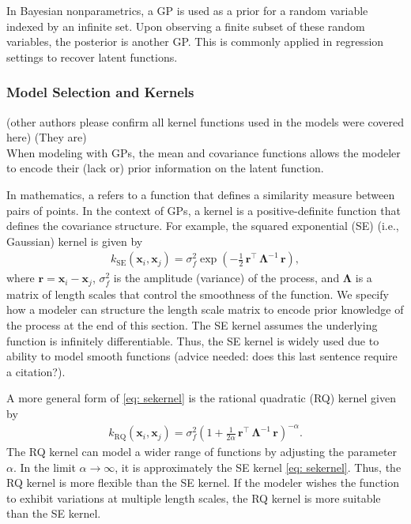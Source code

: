 \documentclass[journal=jacsat,manuscript=article]{achemso}
\newcommand{\mcnote}[1]{{\color{purple} (#1)}}
\newcommand{\alltodo}[1]{{\color{cyan} (#1)}}
\newcommand{\xvec}{\ensuremath{\mathbf{x}}}
\begin{document}
{In Bayesian nonparametrics, a GP is used as a prior for a random variable indexed by an infinite set. Upon observing a finite subset of these random variables, the posterior is another GP. This is commonly applied in regression settings to recover latent functions.

\subsubsection{Model Selection and Kernels}
\alltodo{other authors please confirm all kernel functions used in the models were covered here} 
\mcnote{They are}\\
When modeling with GPs, the mean and covariance functions allows the modeler to encode their (lack or) prior information on the latent function. 

In mathematics, a  refers to a function that defines a similarity measure between pairs of points. In the context of GPs, a kernel is a positive-definite function that defines the covariance structure. For example, the squared exponential (SE) (i.e., Gaussian) kernel is given by
\begin{gather}
    k_{\text{SE}}(\xvec_i,\xvec_j) = \sigma_f^2 \exp \left(-\frac{1}{2}\, \mathbf{r}^\intercal \,\boldsymbol{\Lambda}^{-1} \,\mathbf{r} \right), \label{eq: sekernel}
\end{gather}
where $\mathbf{r} = \xvec_i - \xvec_j$, $\sigma_f^2$ is the amplitude (variance) of the process, and $\boldsymbol{\Lambda}$ is a matrix of length scales that control the smoothness of the function. We specify how a modeler can structure the length scale matrix to encode prior knowledge of the process at the end of this section. The SE kernel assumes the underlying function is infinitely differentiable. Thus, the SE kernel is widely used due to ability to model smooth functions \alltodo{advice needed: does this last sentence require a citation?}.

A more general form of \eqref{eq: sekernel} is the rational quadratic (RQ) kernel given by
\begin{gather}
    k_{\text{RQ}}(\xvec_i,\xvec_j) = \sigma_f^2 \left(1 +\frac{1}{2 \alpha} \,\mathbf{r}^\intercal \,\boldsymbol{\Lambda}^{-1} \,\mathbf{r} \right)^{-\alpha}. \label{eq: rationalquadkernel}
\end{gather}
The RQ kernel can model a wider range of functions by adjusting the parameter $\alpha$. In the limit $\alpha \rightarrow \infty$, it is approximately the SE kernel \eqref{eq: sekernel}. Thus, the RQ kernel is more flexible than the SE kernel. If the modeler wishes the function to exhibit variations at multiple length scales, the RQ kernel is more suitable than the SE kernel.

}
\end{document}
